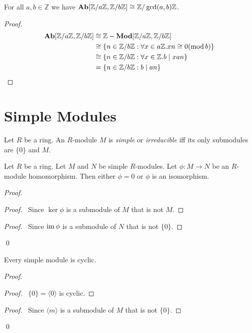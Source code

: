 \begin{cor}
For all $a,b \in \mathbb{Z}$ we have $\mathbf{Ab}[\mathbb{Z} / a \mathbb{Z}, \mathbb{Z} / b \mathbb{Z}] \cong \mathbb{Z} / \gcd(a,b) \mathbb{Z}$.
\end{cor}

\begin{proof}
\pf
\begin{align*}
\mathbf{Ab}[\mathbb{Z} / a \mathbb{Z}, \mathbb{Z} / b \mathbb{Z}]
& \cong {\mathbb{Z}}-\mathbf{Mod}[\mathbb{Z} / a \mathbb{Z}, \mathbb{Z} / b \mathbb{Z}] \\
& \cong \{ n \in \mathbb{Z} / b \mathbb{Z} : \forall x \in a \mathbb{Z}. xn \cong 0 (\operatorname{mod} b) \} \\
& \cong \{ n \in \mathbb{Z} / b \mathbb{Z} : \forall x \in \mathbb{Z}. b \mid xan \} \\
& = \{ n \in \mathbb{Z} / b \mathbb{Z} : b \mid an \}
\end{align*}
\end{proof}
\chapter{Simple Modules}

\begin{df}
Let $R$ be a ring.
An $R$-module $M$ is \emph{simple} or \emph{irreducible} iff its only submodules are $\{0\}$ and $M$.
\end{df}

\begin{prop}
Let $R$ be a ring. Let $M$ and $N$ be simple $R$-modules. Let $\phi : M \rightarrow N$ be an $R$-module homomorphism. Then either $\phi = 0$ or $\phi$ is an isomorphism.
\end{prop}

\begin{proof}
\pf
{}
\begin{proof}
	\pf\ Since $\ker \phi$ is a submodule of $M$ that is not $M$.
\end{proof}
\begin{proof}
	\pf\ Since $\operatorname{im} \phi$ is a submodule of $N$ that is not $\{0\}$.
\end{proof}
\qed
\end{proof}

\begin{prop}
Every simple module is cyclic.
\end{prop}

\begin{proof}
\pf
{}
\begin{proof}
	\pf\ $\{0\} = \langle 0 \rangle$ is cyclic.
\end{proof}
\begin{proof}
	\pf\ Since $\langle m \rangle$ is a submodule of $M$ that is not $\{0\}$.
\end{proof}
\qed
\end{proof}

